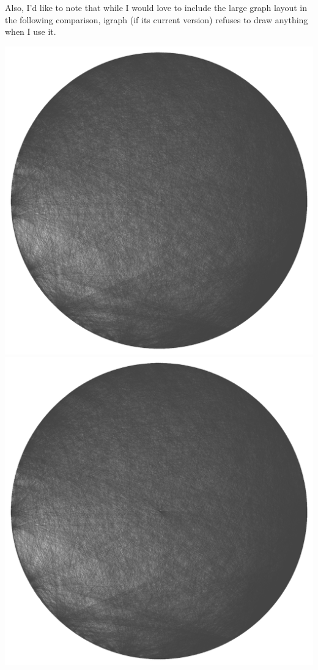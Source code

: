 \documentclass[12pt, a4paper]{article}
\begin{document}
Also, I'd like to note that while I would love to include the large graph layout in the following comparison, igraph (if its current version) refuses to draw anything when I use it.



\begin{multicols}{2}
  {\centering
  \includegraphics[width=\columnwidth]{src/youtube/hdg/comp/1_plot_crc}\\
  \label{fig:hdg_c1}}
  {\centering
  \includegraphics[width=\columnwidth]{src/youtube/hdg/comp/2_plot_str}\\
  \label{fig:hdg_c2}}
\end{multicols}
\end{document}
